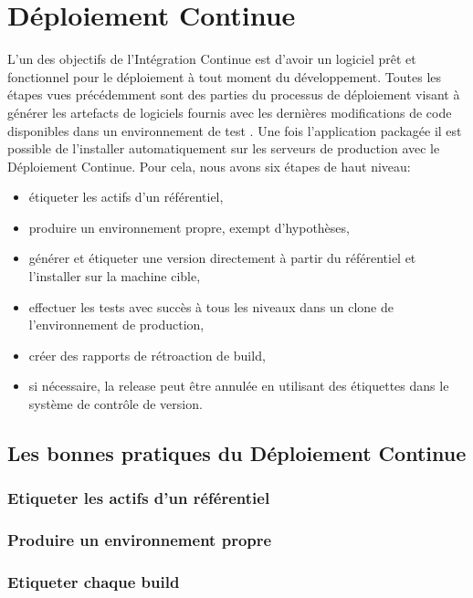 \documentclass{report}
\begin{document}
    \section{Déploiement Continue}
    L'un des objectifs de l’Intégration Continue est d'avoir un logiciel prêt et fonctionnel pour le déploiement à tout moment du développement. Toutes les étapes vues précédemment sont des parties du processus de déploiement visant à générer les artefacts de logiciels fournis avec les dernières modifications de code disponibles dans un environnement de test \cite{Duv07}. Une fois l’application packagée il est possible de l'installer automatiquement sur les serveurs de production avec le Déploiement Continue. Pour cela, nous avons six étapes de haut niveau:\\
    \begin{itemize}
      \item étiqueter les actifs d'un référentiel,
      \item produire un environnement propre, exempt d'hypothèses,
      \item générer et étiqueter une version directement à partir du référentiel et l'installer sur la machine cible,
      \item effectuer les tests avec succès à tous les niveaux dans un clone de l'environnement de production,
      \item créer des rapports de rétroaction de build,
      \item	si nécessaire, la release peut être annulée en utilisant des étiquettes dans le système de contrôle de version.\\
    \end{itemize}

      \subsection{Les bonnes pratiques du Déploiement Continue}

        \subsubsection{Etiqueter les actifs d’un référentiel}

        \subsubsection{Produire un environnement propre}

        \subsubsection{Etiqueter chaque build}
\end{document}
